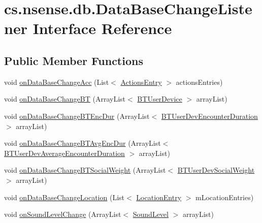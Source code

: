\hypertarget{interfacecs_1_1nsense_1_1db_1_1_data_base_change_listener}{\section{cs.\-nsense.\-db.\-Data\-Base\-Change\-Listener Interface Reference}
\label{interfacecs_1_1nsense_1_1db_1_1_data_base_change_listener}
}
\subsection*{Public Member Functions}
\begin{DoxyCompactItemize}
\item 
void \hyperlink{interfacecs_1_1nsense_1_1db_1_1_data_base_change_listener_aafd4de05a4341b4fc2491710d027175f}{on\-Data\-Base\-Change\-Acc} (List$<$ \hyperlink{classcs_1_1nsense_1_1accelerometer_1_1_actions_entry}{Actions\-Entry} $>$ actions\-Entries)
\item 
void \hyperlink{interfacecs_1_1nsense_1_1db_1_1_data_base_change_listener_a7527454e4118acfe986aee1cc6d679a3}{on\-Data\-Base\-Change\-B\-T} (Array\-List$<$ \hyperlink{classcs_1_1nsense_1_1bluetooth_1_1_b_t_user_device}{B\-T\-User\-Device} $>$ array\-List)
\item 
void \hyperlink{interfacecs_1_1nsense_1_1db_1_1_data_base_change_listener_a3c6d1ae23584b061581d0dc46b41a8e8}{on\-Data\-Base\-Change\-B\-T\-Enc\-Dur} (Array\-List$<$ \hyperlink{classcs_1_1nsense_1_1bluetooth_1_1_b_t_user_dev_encounter_duration}{B\-T\-User\-Dev\-Encounter\-Duration} $>$ array\-List)
\item 
void \hyperlink{interfacecs_1_1nsense_1_1db_1_1_data_base_change_listener_a3fe05c07dc13d3b3fc5d5db7dba8de41}{on\-Data\-Base\-Change\-B\-T\-Avg\-Enc\-Dur} (Array\-List$<$ \hyperlink{classcs_1_1nsense_1_1bluetooth_1_1_b_t_user_dev_average_encounter_duration}{B\-T\-User\-Dev\-Average\-Encounter\-Duration} $>$ array\-List)
\item 
void \hyperlink{interfacecs_1_1nsense_1_1db_1_1_data_base_change_listener_abb783aae81e73d9fefc2333e64b5f895}{on\-Data\-Base\-Change\-B\-T\-Social\-Weight} (Array\-List$<$ \hyperlink{classcs_1_1nsense_1_1bluetooth_1_1_b_t_user_dev_social_weight}{B\-T\-User\-Dev\-Social\-Weight} $>$ array\-List)
\item 
void \hyperlink{interfacecs_1_1nsense_1_1db_1_1_data_base_change_listener_aa48a612808ddaede44b3a580cd0d139d}{on\-Data\-Base\-Change\-Location} (List$<$ \hyperlink{classcs_1_1nsense_1_1location_1_1_location_entry}{Location\-Entry} $>$ m\-Location\-Entries)
\item 
void \hyperlink{interfacecs_1_1nsense_1_1db_1_1_data_base_change_listener_a2eb333ae428e339c86f90a844578bf39}{on\-Sound\-Level\-Change} (Array\-List$<$ \hyperlink{classcs_1_1nsense_1_1microphone_1_1_sound_level}{Sound\-Level} $>$ array\-List)
\end{DoxyCompactItemize}


